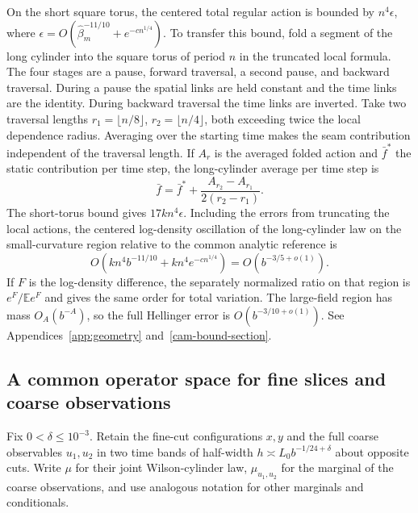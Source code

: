 \documentclass[11pt,a4paper]{article}
\numberwithin{equation}{section}
\begin{document}
On the short square torus, the centered total regular action is bounded by \(n^4\epsilon\), where \(\epsilon=O(\widehat\beta_m^{-11/10}+e^{-c n^{1/4}})\). To transfer this bound, fold a segment of the long cylinder into the square torus of period \(n\) in the truncated local formula. The four stages are a pause, forward traversal, a second pause, and backward traversal. During a pause the spatial links are held constant and the time links are the identity. During backward traversal the time links are inverted. Take two traversal lengths \(r_1=\lfloor n/8\rfloor\), \(r_2=\lfloor n/4\rfloor\), both exceeding twice the local dependence radius. Averaging over the starting time makes the seam contribution independent of the traversal length. If \(A_r\) is the averaged folded action and \(\bar f^*\) the static contribution per time step, the long-cylinder average per time step is
\[
 \bar f=\bar f^*+\frac{A_{r_2}-A_{r_1}}{2(r_2-r_1)}.
\]
The short-torus bound gives \(17kn^4\epsilon\). Including the errors from truncating the local actions, the centered log-density oscillation of the long-cylinder law on the small-curvature region relative to the common analytic reference is
\begin{equation}
 O(kn^4 b^{-11/10}+kn^4e^{-c n^{1/4}})
      =O(b^{-3/5+o(1)}).
 \label{eq:paper-density}
\end{equation}
If \(F\) is the log-density difference, the separately normalized ratio on that region is \(e^F/\mathbb E e^F\) and gives the same order for total variation. The large-field region has mass \(O_A(b^{-A})\), so the full Hellinger error is \(O(b^{-3/10+o(1)})\). See Appendices~\ref{app:geometry} and~\ref{cam-bound-section}.

\subsection{A common operator space for fine slices and coarse observations}

Fix \(0<\delta\le10^{-3}\). Retain the fine-cut configurations \(x,y\) and the full coarse observables \(u_1,u_2\) in two time bands of half-width \(h\asymp L_0b^{-1/24+\delta}\) about opposite cuts. Write \(\mu\) for their joint Wilson-cylinder law, \(\mu_{u_1,u_2}\) for the marginal of the coarse observations, and use analogous notation for other marginals and conditionals.
\end{document}
